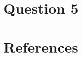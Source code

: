 \documentclass{assignment}
\begin{document}
\section{Question 5}




\newpage
\section{References}
\nocite{*} 
   
     
\end{document}

